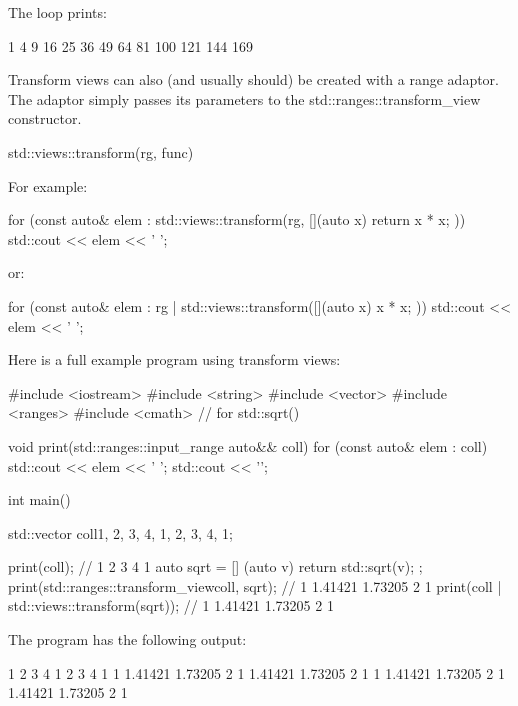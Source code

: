 The loop prints:

\begin{shell}
1 4 9 16 25 36 49 64 81 100 121 144 169
\end{shell}


Transform views can also (and usually should) be created with a range adaptor. The adaptor simply passes its parameters to the std::ranges::transform\_view constructor.

\begin{cpp}
std::views::transform(rg, func)
\end{cpp}

For example:

\begin{cpp}
for (const auto& elem : std::views::transform(rg, [](auto x) {
						return x * x;
					})) {
	std::cout << elem << ' ';
}
\end{cpp}

or:

\begin{cpp}
for (const auto& elem : rg | std::views::transform([](auto x) {
						x * x;
					})) {
	std::cout << elem << ' ';
}
\end{cpp}

Here is a full example program using transform views:


\begin{cpp}
#include <iostream>
#include <string>
#include <vector>
#include <ranges>
#include <cmath> // for std::sqrt()

void print(std::ranges::input_range auto&& coll)
{
	for (const auto& elem : coll) {
		std::cout << elem << ' ';
	}
	std::cout << '\n';
}

int main()
{
	std::vector coll{1, 2, 3, 4, 1, 2, 3, 4, 1};
	
	print(coll); // 1 2 3 4 1
	auto sqrt = [] (auto v) { return std::sqrt(v); };
	print(std::ranges::transform_view{coll, sqrt}); // 1 1.41421 1.73205 2 1
	print(coll | std::views::transform(sqrt)); // 1 1.41421 1.73205 2 1
}
\end{cpp}

The program has the following output:

\begin{shell}
1 2 3 4 1 2 3 4 1
1 1.41421 1.73205 2 1 1.41421 1.73205 2 1
1 1.41421 1.73205 2 1 1.41421 1.73205 2 1
\end{shell}


